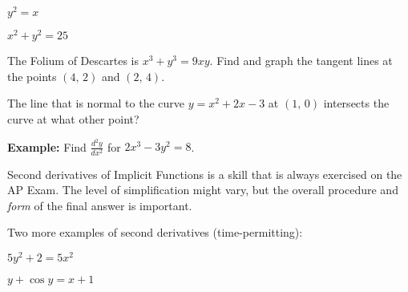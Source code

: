 \begin{questions}
    \begin{minipage}{.45\linewidth}
    \question $\displaystyle y^2=x$
    \end{minipage}
    \hfill
    \begin{minipage}{.45\linewidth}
    \question $\displaystyle x^2+y^2=25$
    \end{minipage}
    
    
    \question The Folium of Descartes is $x^3+y^3=9xy$. Find and graph the tangent lines at the points $(4,\,2)$ and $(2,\,4)$.
    
    
    
    \newpage
    
    \question The line that is normal to the curve $y=x^2+2x-3$ at $(1,\,0)$ intersects the curve at what other point?
    
\end{questions}


\textbf{Example:} Find $\displaystyle\frac{d^2y}{dx^2}$ for $2x^3-3y^2=8$.

Second derivatives of Implicit Functions is a skill that is always exercised on the AP Exam. The level of simplification might vary, but the overall procedure and \textit{form} of the final answer is important.

\newpage

Two more examples of second derivatives (time-permitting):
\begin{questions}
    \question $\displaystyle 5y^2+2=5x^2$
    
    \question $y+\cos y=x+1$
\end{questions}

\newpage

